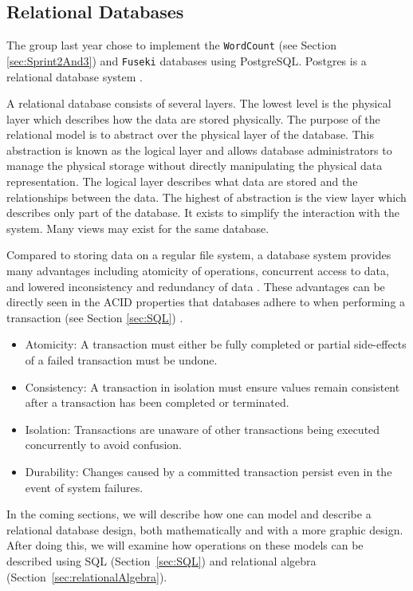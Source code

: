 \subsection{Relational Databases}
The group last year chose to implement the \texttt{WordCount} (see Section \ref{sec:Sprint2And3}) and \texttt{Fuseki} databases using PostgreSQL.
Postgres is a relational database system \cite{knox2020}.


A relational database consists of several layers.
The lowest level is the physical layer which describes how the data are stored physically.
The purpose of the relational model is to abstract over the physical layer of the database.
This abstraction is known as the logical layer and allows database administrators to manage the physical storage without directly manipulating the physical data representation.
The logical layer describes what data are stored and the relationships between the data.
The highest of abstraction is the view layer which describes only part of the database. It exists to simplify the interaction with the system. Many views may exist for the same database.
\cite[Chapter 1.3]{DBSBook}

Compared to storing data on a regular file system, a database system provides many advantages including atomicity of operations, concurrent access to data, and lowered inconsistency and redundancy of data \cite[Chapter 1.2]{DBSBook}.
These advantages can be directly seen in the ACID properties that databases adhere to when performing a transaction (see Section \ref{sec:SQL}) \cite[Chapter~17]{DBSBook}.
\begin{itemize} \label{ACID}
    \item Atomicity: A transaction must either be fully completed or partial side-effects of a failed transaction must be undone.
    \item Consistency: A transaction in isolation must ensure values remain consistent after a transaction has been completed or terminated.
    \item Isolation: Transactions are unaware of other transactions being executed concurrently to avoid confusion.
    \item Durability: Changes caused by a committed transaction persist even in the event of system failures.
\end{itemize}

In the coming sections, we will describe how one can model and describe a relational database design, both mathematically and with a more graphic design.
After doing this, we will examine how operations on these models can be described using SQL (Section~\ref{sec:SQL}) and relational algebra (Section~\ref{sec:relationalAlgebra}).

